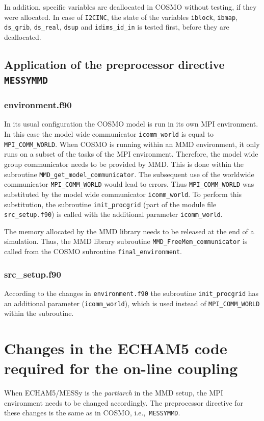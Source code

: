 \documentclass[11pt,twoside]{article}
\begin{document}
In addition, specific variables are deallocated in COSMO without testing, if 
they were allocated. In case of {\tt \large I2CINC},
 the state of the variables 
\verb|iblock|, \verb|ibmap|, \verb|ds_grib|, \verb|ds_real|, \verb|dsup|
and
\verb|idims_id_in| is tested first, before they are deallocated.

\subsection{Application of the  preprocessor directive {\tt \large MESSYMMD}}
\subsubsection{environment.f90}
In its usual configuration the COSMO model is run in its own MPI environment. 
In this case the model wide communicator \verb|icomm_world| is equal to 
\verb|MPI_COMM_WORLD|. When COSMO is running within an MMD environment, it
only runs on a subset of the tasks of the MPI environment.
Therefore, the model wide group communicator needs to be provided by MMD. 
This is done within the subroutine \verb|MMD_get_model_communicator|. 
The subsequent use
of the worldwide communicator \verb|MPI_COMM_WORLD| would lead to errors.
 Thus \verb|MPI_COMM_WORLD| was substituted by the
model wide communicator \verb|icomm_world|.
To perform this substitution, the subroutine \verb|init_procgrid| (part of the
module file \verb|src_setup.f90|) is called with 
the additional parameter \verb|icomm_world|.

The memory allocated by the MMD library needs to be released at the end of a 
simulation.
Thus, the MMD library subroutine \verb|MMD_FreeMem_communicator| is called 
from the COSMO subroutine \verb|final_environment|.

\subsubsection{src\_setup.f90}
According to the changes in \verb|environment.f90| the subroutine
 \verb|init_procgrid| has an additional parameter (\verb|icomm_world|),
which is used instead of \verb|MPI_COMM_WORLD| within the subroutine.


\section{Changes in the ECHAM5 code required for the on-line coupling}
\label{sec:ECHAM5code}
When ECHAM5/MESSy is the {\it partiarch} in the MMD setup, the MPI
environment needs to be  
changed accordingly. The preprocessor directive for these changes 
is the same as in COSMO, i.e.,\ {\tt \large MESSYMMD}.
\end{document}
